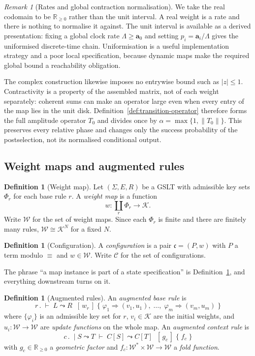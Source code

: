 \documentclass[11pt,a4paper]{article}
\theoremstyle{plain}
\theoremstyle{definition}
\newtheorem{definition}[theorem]{Definition}
\theoremstyle{remark}
\newtheorem{remark}[theorem]{Remark}
\newcommand{\Rnn}{\mathbb{R}_{\geq 0}}
\newcommand{\Cfg}{\mathcal{C}}
\newcommand{\Wt}{\mathcal{W}}
\newcommand{\prop}{\mathbf{a}}
\newcommand{\wmap}{w}
\newcommand{\gfac}{g}
\begin{document}
\begin{remark}[Rates and global contraction normalisation]
\label{rem:rnn}
We take the real codomain to be $\Rnn$ rather than the unit interval. A real weight is a rate and
there is nothing to normalise it against. The unit interval is available as a derived presentation:
fixing a global clock rate $\Lambda\geq\prop_0$ and setting $p_i=\prop_i/\Lambda$ gives the
uniformised discrete-time chain. Uniformisation is a useful implementation strategy and a poor local
specification, because dynamic maps make the required global bound a reachability obligation.

The complex construction likewise imposes no entrywise bound such as $|z|\leq 1$. Contractivity is a
property of the assembled matrix, not of each weight separately: coherent sums can make an operator
large even when every entry of the map lies in the unit disk. Definition~\ref{def:transition-operator}
therefore forms the full amplitude operator $T_0$ and divides once by
$\alpha=\max\{1,\|T_0\|\}$. This preserves every relative phase and changes only the success
probability of the postselection, not its normalised conditional output.
\end{remark}

\subsection{Weight maps and augmented rules}

\begin{definition}[Weight map]
\label{def:wmap}
Let $(\Sigma, E, R)$ be a GSLT with admissible key sets $\Phi_r$ for each base rule $r$. A
\emph{weight map} is a function
\[
\wmap : \textstyle\coprod_{r} \Phi_r \longrightarrow \mathcal{K}.
\]
Write $\Wt$ for the set of weight maps. Since each $\Phi_r$ is finite and there are finitely many
rules, $\Wt \cong \mathcal{K}^N$ for a fixed $N$.
\end{definition}

\begin{definition}[Configuration]
\label{def:config}
A \emph{configuration} is a pair $\mathfrak{c} = (P, \wmap)$ with $P$ a term modulo $\equiv$ and
$\wmap \in \Wt$. Write $\Cfg$ for the set of configurations.
\end{definition}

The phrase ``a map instance is part of a state specification'' is Definition~\ref{def:config}, and
everything downstream turns on it.

\begin{definition}[Augmented rules]
\label{def:augmented}
An \emph{augmented base rule} is
\[
r \,.\; \vdash\; L \leadsto R \;\; [\,\wmap_r\,]
\;\{\; \varphi_1 \Rightarrow (v_1, u_1), \;\ldots,\; \varphi_m \Rightarrow (v_m, u_m) \;\}
\]
where $\{\varphi_i\}$ is an admissible key set for $r$, $v_i \in \mathcal{K}$ are the initial
weights, and $u_i : \Wt \to \Wt$ are \emph{update functions} on the whole map. An \emph{augmented
context rule} is
\[
c \,.\; \mid S \leadsto T \;\vdash\; C[S] \leadsto C[T] \;\; [\,\gfac_c\,] \;\{\; f_c \;\}
\]
with $\gfac_c \in \Rnn$ a \emph{geometric factor} and $f_c : \Wt^* \times \Wt \to \Wt$ a
\emph{fold function}.
\end{definition}
\end{document}
